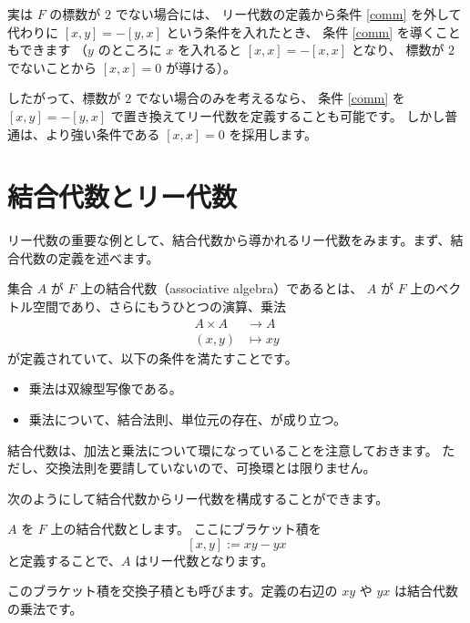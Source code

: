 \documentclass{ltjsarticle}
\begin{document}
実は \(F\) の標数が \(2\) でない場合には、
リー代数の定義から条件 \ref{comm} を外して代わりに \([x, y] = -[y, x]\) という条件を入れたとき、
条件 \ref{comm} を導くこともできます
（\(y\) のところに \(x\) を入れると \([x, x] = -[x, x]\) となり、
標数が \(2\) でないことから \([x, x] = 0\) が導ける）。

したがって、標数が \(2\) でない場合のみを考えるなら、
条件 \ref{comm} を \([x, y] = -[y, x]\) で置き換えてリー代数を定義することも可能です。
しかし普通は、より強い条件である \([x, x] = 0\) を採用します。

\section{結合代数とリー代数}

リー代数の重要な例として、結合代数から導かれるリー代数をみます。まず、結合代数の定義を述べます。

\begin{definition}[結合代数]
    集合 \(A\) が \(F\) 上の結合代数（associative algebra）であるとは、
    \(A\) が \(F\) 上のベクトル空間であり、さらにもうひとつの演算、乗法
    \begin{align*}
        A \times A & \to A      \\
        (x, y)     & \mapsto xy
    \end{align*}
    が定義されていて、以下の条件を満たすことです。
    \begin{itemize}
        \item 乗法は双線型写像である。
        \item 乗法について、結合法則、単位元の存在、が成り立つ。
    \end{itemize}
\end{definition}

結合代数は、加法と乗法について環になっていることを注意しておきます。
ただし、交換法則を要請していないので、可換環とは限りません。

次のようにして結合代数からリー代数を構成することができます。

\begin{example}[結合代数から導かれるリー代数]\label{commutator}
    \(A\) を \(F\) 上の結合代数とします。
    ここにブラケット積を
    \[
        [x, y] := xy - yx
    \]
    と定義することで、\(A\) はリー代数となります。
\end{example}

このブラケット積を交換子積とも呼びます。定義の右辺の \(xy\) や \(yx\) は結合代数の乗法です。
\end{document}
